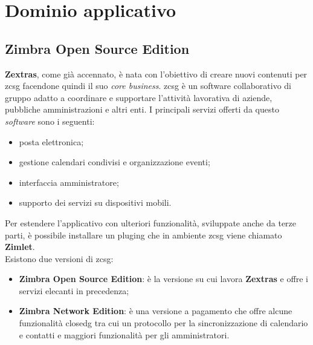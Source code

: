 \section{Dominio applicativo}
    \subsection{Zimbra Open Source Edition}
        \textbf{Zextras}, come già accennato, è nata con l'obiettivo di creare nuovi contenuti per \gls{zcsg} facendone quindi il suo \textit{core business}.
        \gls{zcsg} è un software collaborativo di gruppo adatto a coordinare e supportare l'attività lavorativa di aziende, pubbliche amministrazioni e altri enti. I principali servizi offerti da questo \textit{software} sono i seguenti:
        \begin{itemize}
            \item posta elettronica;
            \item gestione calendari condivisi e organizzazione eventi;
            \item interfaccia amministratore;
            \item supporto dei servizi su dispositivi mobili.
        \end{itemize}
        Per estendere l'applicativo con ulteriori funzionalità, sviluppate anche da terze parti, è possibile installare un \gls{pluging} che in ambiente \gls{zcsg} viene chiamato \textbf{Zimlet}. \\
        Esistono due versioni di \gls{zcsg}:
        \begin{itemize}
            \setlength\itemsep{0em}
            \item \textbf{Zimbra Open Source Edition}: è la versione su cui lavora \textbf{Zextras} e offre i servizi elecanti in precedenza;
            \item \textbf{Zimbra Network Edition}: è una versione a pagamento che offre alcune funzionalità \gls{closedg} tra cui un protocollo per la sincronizzazione di calendario e contatti e maggiori funzionalità per gli amministratori.
        \end{itemize}
        
